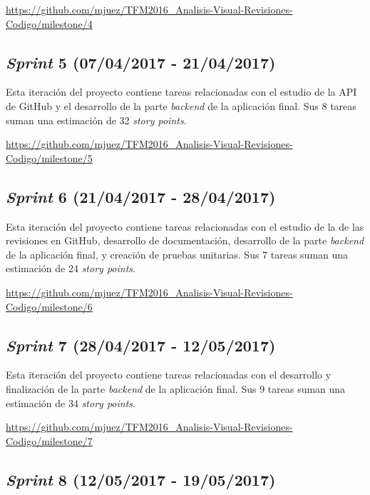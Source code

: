 \url{https://github.com/mjuez/TFM2016_Analisis-Visual-Revisiones-Codigo/milestone/4}


\subsection{\textit{Sprint} 5 (07/04/2017 - 21/04/2017)}

Esta iteración del proyecto contiene tareas relacionadas con el estudio de la API de GitHub y el desarrollo de la parte \textit{backend} de la aplicación final. Sus 8 tareas suman una estimación de 32 \textit{story points}.

\url{https://github.com/mjuez/TFM2016_Analisis-Visual-Revisiones-Codigo/milestone/5}


\subsection{\textit{Sprint} 6 (21/04/2017 - 28/04/2017)}

Esta iteración del proyecto contiene tareas relacionadas con el estudio de la de las revisiones en GitHub, desarrollo de documentación, desarrollo de la parte \textit{backend} de la aplicación final, y creación de pruebas unitarias. Sus 7 tareas suman una estimación de 24 \textit{story points}.

\url{https://github.com/mjuez/TFM2016_Analisis-Visual-Revisiones-Codigo/milestone/6}


\subsection{\textit{Sprint} 7 (28/04/2017 - 12/05/2017)}

Esta iteración del proyecto contiene tareas relacionadas con el desarrollo y finalización de la parte \textit{backend} de la aplicación final. Sus 9 tareas suman una estimación de 34 \textit{story points}.

\url{https://github.com/mjuez/TFM2016_Analisis-Visual-Revisiones-Codigo/milestone/7}


\subsection{\textit{Sprint} 8 (12/05/2017 - 19/05/2017)}

